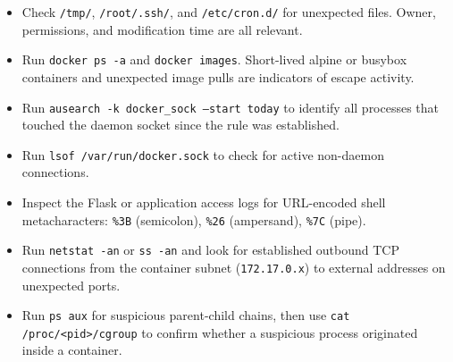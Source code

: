 \begin{itemize}
    \item Check \texttt{/tmp/}, \texttt{/root/.ssh/}, and \texttt{/etc/cron.d/} for unexpected files. Owner, permissions, and modification time are all relevant.
    \item Run \texttt{docker ps -a} and \texttt{docker images}. Short-lived alpine or busybox containers and unexpected image pulls are indicators of escape activity.
    \item Run \texttt{ausearch -k docker\_sock --start today} to identify all processes that touched the daemon socket since the rule was established.
    \item Run \texttt{lsof /var/run/docker.sock} to check for active non-daemon connections.
    \item Inspect the Flask or application access logs for URL-encoded shell metacharacters: \texttt{\%3B} (semicolon), \texttt{\%26} (ampersand), \texttt{\%7C} (pipe).
    \item Run \texttt{netstat -an} or \texttt{ss -an} and look for established outbound TCP connections from the container subnet (\texttt{172.17.0.x}) to external addresses on unexpected ports.
    \item Run \texttt{ps aux} for suspicious parent-child chains, then use \texttt{cat /proc/<pid>/cgroup} to confirm whether a suspicious process originated inside a container.
\end{itemize}